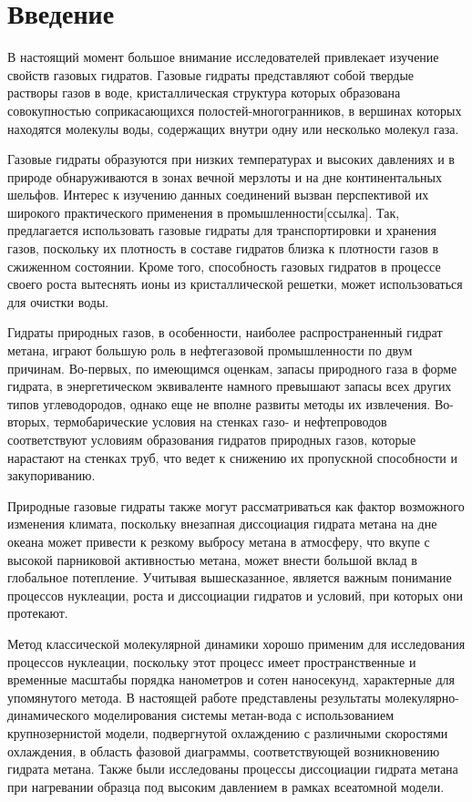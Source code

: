 \chapter*{Введение}
В настоящий момент большое внимание исследователей привлекает изучение свойств газовых гидратов. Газовые гидраты представляют собой твердые растворы газов в воде, кристаллическая структура которых образована совокупностью соприкасающихся полостей-многогранников, в вершинах которых находятся молекулы воды, содержащих внутри одну или несколько молекул газа.

Газовые гидраты образуются при низких температурах и высоких давлениях и в природе обнаруживаются в зонах вечной мерзлоты и на дне континентальных шельфов. Интерес к изучению данных соединений вызван перспективой их широкого практического применения в промышленности[ссылка]. Так, предлагается использовать газовые гидраты для транспортировки и хранения газов, поскольку их плотность в составе гидратов близка к плотности газов в сжиженном состоянии. Кроме того, способность газовых гидратов в процессе своего роста вытеснять ионы из кристаллической решетки, может использоваться для очистки воды.

Гидраты природных газов, в особенности, наиболее распространенный гидрат метана, играют большую роль в нефтегазовой промышленности по двум причинам. Во-первых, по имеющимся оценкам, запасы природного газа в форме гидрата, в энергетическом эквиваленте намного превышают запасы всех других типов углеводородов, однако еще не вполне развиты методы их извлечения. Во-вторых, термобарические условия на стенках газо- и нефтепроводов соответствуют условиям образования гидратов природных газов, которые нарастают на стенках труб, что ведет к снижению их пропускной способности и закупориванию. 

Природные газовые гидраты также могут рассматриваться как фактор возможного изменения климата, поскольку внезапная диссоциация гидрата метана на дне океана может привести к резкому выбросу метана в атмосферу, что вкупе с высокой парниковой активностью метана, может внести большой вклад в глобальное потепление. Учитывая вышесказанное, является важным понимание процессов нуклеации, роста и диссоциации гидратов и условий, при которых они протекают.


Метод классической молекулярной динамики хорошо применим для исследования процессов нуклеации, поскольку этот процесс имеет пространственные и временные масштабы порядка нанометров и сотен наносекунд, характерные для упомянутого метода. В настоящей работе представлены результаты молекулярно-динамического моделирования системы метан-вода с использованием крупнозернистой модели, подвергнутой охлаждению с различными скоростями охлаждения, в область фазовой диаграммы, соответствующей возникновению гидрата метана. Также были исследованы процессы диссоциации гидрата метана при нагревании образца под высоким давлением в рамках всеатомной модели.